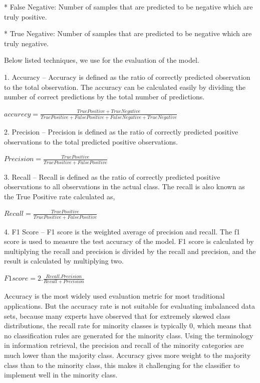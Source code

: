 \documentclass{article}
\begin{document}
* False Negative: Number of samples that are predicted to be
negative which are truly positive.


* True Negative: Number of samples that are predicted to be
negative which are truly negative.



Below listed techniques, we use for the evaluation of the model.


1. Accuracy – Accuracy is defined as the ratio of correctly
predicted observation to the total observation. The accuracy
can be calculated easily by dividing the number of correct
predictions by the total number of predictions.

$accurecy=\frac{True Positive + True Negative}{True Positive + False Positive + False Negative + True Negative}$

2. Precision – Precision is defined as the ratio of correctly
predicted positive observations to the total predicted positive
observations.

$ Precision=\frac{True Positive }{True Positive + False Positive}$


3. Recall – Recall is defined as the ratio of correctly predicted
positive observations to all observations in the actual class.
The recall is also known as the True Positive rate calculated
as,

$  Recall=\frac{True Positive }{True Positive + False Positive}$


4. F1 Score – F1 score is the weighted average of precision and
recall. The f1 score is used to measure the test accuracy of the
model. F1 score is calculated by multiplying the recall and
precision is divided by the recall and precision, and the result
is calculated by multiplying two.

$ F1 score= 2 . \frac{Recall . Precision}{Recall + Precision}$

Accuracy is the most widely used evaluation metric for most
traditional applications. But the accuracy rate is not suitable for
evaluating imbalanced data sets, because many experts have observed
that for extremely skewed class distributions, the recall rate for
minority classes is typically 0, which means that no classification rules
are generated for the minority class. Using the terminology in
information retrieval, the precision and recall of the minority
categories are much lower than the majority class. Accuracy gives
more weight to the majority class than to the minority class, this makes
it challenging for the classifier to implement well in the minority class.
\end{document}
